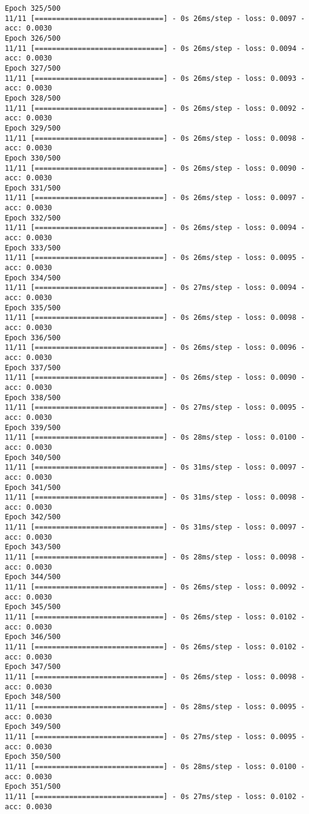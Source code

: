 \documentclass[11pt]{article}
\begin{document}
\begin{Verbatim}[commandchars=\\\{\}]
Epoch 325/500
11/11 [==============================] - 0s 26ms/step - loss: 0.0097 - acc: 0.0030
Epoch 326/500
11/11 [==============================] - 0s 26ms/step - loss: 0.0094 - acc: 0.0030
Epoch 327/500
11/11 [==============================] - 0s 26ms/step - loss: 0.0093 - acc: 0.0030
Epoch 328/500
11/11 [==============================] - 0s 26ms/step - loss: 0.0092 - acc: 0.0030
Epoch 329/500
11/11 [==============================] - 0s 26ms/step - loss: 0.0098 - acc: 0.0030
Epoch 330/500
11/11 [==============================] - 0s 26ms/step - loss: 0.0090 - acc: 0.0030
Epoch 331/500
11/11 [==============================] - 0s 26ms/step - loss: 0.0097 - acc: 0.0030
Epoch 332/500
11/11 [==============================] - 0s 26ms/step - loss: 0.0094 - acc: 0.0030
Epoch 333/500
11/11 [==============================] - 0s 26ms/step - loss: 0.0095 - acc: 0.0030
Epoch 334/500
11/11 [==============================] - 0s 27ms/step - loss: 0.0094 - acc: 0.0030
Epoch 335/500
11/11 [==============================] - 0s 26ms/step - loss: 0.0098 - acc: 0.0030
Epoch 336/500
11/11 [==============================] - 0s 26ms/step - loss: 0.0096 - acc: 0.0030
Epoch 337/500
11/11 [==============================] - 0s 26ms/step - loss: 0.0090 - acc: 0.0030
Epoch 338/500
11/11 [==============================] - 0s 27ms/step - loss: 0.0095 - acc: 0.0030
Epoch 339/500
11/11 [==============================] - 0s 28ms/step - loss: 0.0100 - acc: 0.0030
Epoch 340/500
11/11 [==============================] - 0s 31ms/step - loss: 0.0097 - acc: 0.0030
Epoch 341/500
11/11 [==============================] - 0s 31ms/step - loss: 0.0098 - acc: 0.0030
Epoch 342/500
11/11 [==============================] - 0s 31ms/step - loss: 0.0097 - acc: 0.0030
Epoch 343/500
11/11 [==============================] - 0s 28ms/step - loss: 0.0098 - acc: 0.0030
Epoch 344/500
11/11 [==============================] - 0s 26ms/step - loss: 0.0092 - acc: 0.0030
Epoch 345/500
11/11 [==============================] - 0s 26ms/step - loss: 0.0102 - acc: 0.0030
Epoch 346/500
11/11 [==============================] - 0s 26ms/step - loss: 0.0102 - acc: 0.0030
Epoch 347/500
11/11 [==============================] - 0s 26ms/step - loss: 0.0098 - acc: 0.0030
Epoch 348/500
11/11 [==============================] - 0s 28ms/step - loss: 0.0095 - acc: 0.0030
Epoch 349/500
11/11 [==============================] - 0s 27ms/step - loss: 0.0095 - acc: 0.0030
Epoch 350/500
11/11 [==============================] - 0s 28ms/step - loss: 0.0100 - acc: 0.0030
Epoch 351/500
11/11 [==============================] - 0s 27ms/step - loss: 0.0102 - acc: 0.0030

\end{Verbatim}
\end{document}
